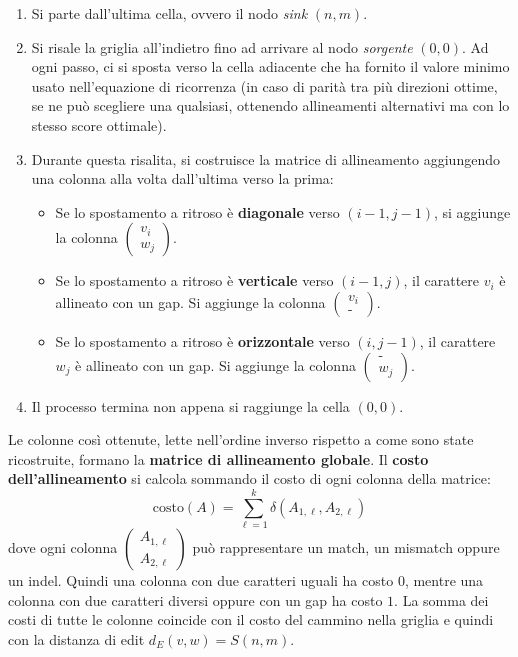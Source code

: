 \begin{enumerate}
    \item Si parte dall'ultima cella, ovvero il nodo \textit{sink} $(n, m)$.
    \item Si risale la griglia all'indietro fino ad arrivare al nodo \textit{sorgente} $(0, 0)$. Ad ogni passo, ci si sposta verso la cella adiacente che ha fornito il valore minimo usato nell'equazione di ricorrenza (in caso di parità tra più direzioni ottime, se ne può scegliere una qualsiasi, ottenendo allineamenti alternativi ma con lo stesso score ottimale).
    \item Durante questa risalita, si costruisce la matrice di allineamento aggiungendo una colonna alla volta dall'ultima verso la prima:
    \begin{itemize}
        \item Se lo spostamento a ritroso è \textbf{diagonale} verso $(i-1, j-1)$, si aggiunge la colonna $\begin{pmatrix} v_i \\ w_j \end{pmatrix}$.
        \item Se lo spostamento a ritroso è \textbf{verticale} verso $(i-1, j)$, il carattere $v_i$ è allineato con un gap. Si aggiunge la colonna $\begin{pmatrix} v_i \\ \text{-} \end{pmatrix}$.
        \item Se lo spostamento a ritroso è \textbf{orizzontale} verso $(i, j-1)$, il carattere $w_j$ è allineato con un gap. Si aggiunge la colonna $\begin{pmatrix} \text{-} \\ w_j \end{pmatrix}$.
    \end{itemize}
    \item Il processo termina non appena si raggiunge la cella $(0, 0)$. 
\end{enumerate}

Le colonne così ottenute, lette nell'ordine inverso rispetto a come sono state ricostruite, formano la \textbf{matrice di allineamento globale}. Il \textbf{costo dell'allineamento} si calcola sommando il costo di ogni colonna della matrice:
\begin{equation}
    \text{costo}(A) = \sum_{\ell=1}^{k} \delta(A_{1,\ell}, A_{2,\ell})
\end{equation}
dove ogni colonna $\begin{pmatrix} A_{1,\ell} \\ A_{2,\ell} \end{pmatrix}$ può rappresentare un match, un mismatch oppure un indel. Quindi una colonna con due caratteri uguali ha costo $0$, mentre una colonna con due caratteri diversi oppure con un gap ha costo $1$. La somma dei costi di tutte le colonne coincide con il costo del cammino nella griglia e quindi con la distanza di edit $d_E(v,w)=S(n,m)$.
\newpage
